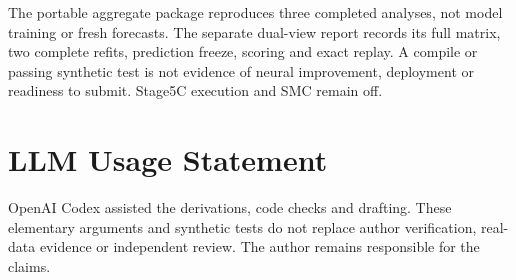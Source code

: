 \documentclass[10pt,twocolumn,letterpaper]{article}
\begin{document}
The portable aggregate package reproduces three completed analyses, not model training or fresh forecasts. The separate dual-view report records its full matrix, two complete refits, prediction freeze, scoring and exact replay. A compile or passing synthetic test is not evidence of neural improvement, deployment or readiness to submit. Stage5C execution and SMC remain off.


\section*{LLM Usage Statement}

OpenAI Codex assisted the derivations, code checks and drafting. These elementary arguments and synthetic tests do not replace author verification, real-data evidence or independent review. The author remains responsible for the claims.
\end{document}
